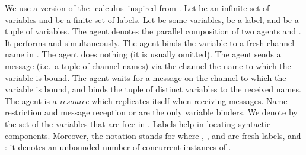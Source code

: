 \documentclass{article}
\newcommand{\picalcul}{-calculus}
\begin{document}
We use  a version of the \picalcul\  inspired from
\cite{milner:polyadic,turner:thesis,cham}.
Let  be  an infinite set of variables and  be a finite set of labels. 
Let  be some variables,  be a label, 
and  be a tuple of variables.
The agent  denotes the parallel composition of two agents  and . It performs  and  simultaneously. 
The agent  binds the variable  to a fresh channel name in .
The agent  does nothing (it is usually omitted).
The agent   sends a message (i.e.~a tuple of channel names) via the channel the name to which the variable  is bound. 
The agent  waits for a message on the channel  to which the variable  is bound, and binds the tuple  of distinct variables to the received  names. The agent  is a \emph{resource} which replicates itself when  receiving messages.
Name restriction  and message reception  or  are the only variable binders.
We denote by  the set of the variables that are free in . 
Labels help in locating syntactic components. 
Moreover, the notation  stands for  where , , and  are fresh labels, and : it denotes an unbounded number of concurrent instances of .
\end{document}

